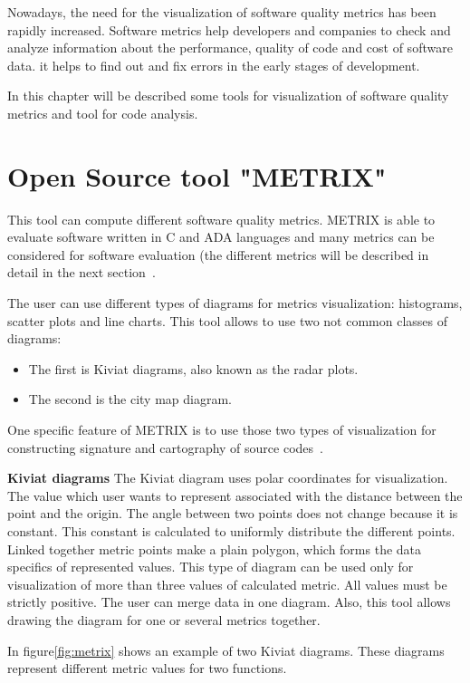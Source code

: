 Nowadays, the need for the visualization of software quality metrics has been rapidly increased. Software metrics help developers and companies to check and analyze information about the performance, quality of code and cost of software data. it helps to find out and fix errors in the early stages of development.

In this chapter will be described some tools for visualization of software quality metrics and tool for code analysis.

\section{Open Source tool "METRIX"}

This tool can compute different software quality metrics. METRIX is able to evaluate software written in C and ADA languages and many metrics can be considered for software evaluation (the different metrics will be described in detail in the next section~\cite{metrix}. 

The user can use different types of diagrams for metrics visualization: histograms, scatter plots and line charts. 
This tool allows to use two not common classes of diagrams: 

\begin{itemize}
	\item The first is Kiviat diagrams, also known as the radar plots.
	\item The second is the city map diagram.
\end{itemize}

One specific feature of METRIX is to use those two types of visualization for constructing signature and cartography of source codes~\cite{metrix}.
 
\textbf{Kiviat diagrams}
The Kiviat diagram uses polar coordinates for visualization. The value which user wants to represent associated with the distance between the point and the origin. The angle between two points does not change because it is constant. This constant is calculated to uniformly distribute the different points. Linked together metric points make a plain polygon, which forms the data specifics of represented values. This type of diagram can be used only for visualization of more than three values of calculated metric. All values must be strictly positive. The user can merge data in one diagram. Also, this tool allows drawing the diagram for one or several metrics together. 

In figure\ref{fig:metrix} shows an example of two Kiviat diagrams. These diagrams represent different metric values for two functions. 

